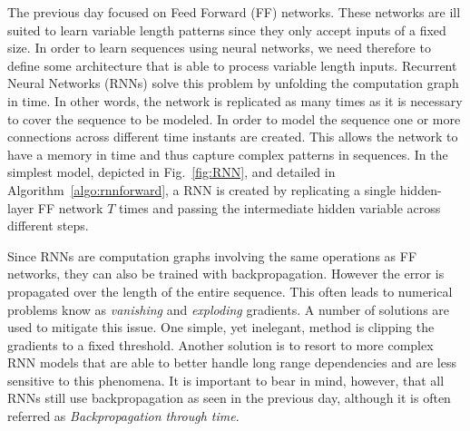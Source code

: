 The previous day focused on Feed Forward (FF) networks. These networks are ill
suited to learn variable length patterns since they only accept inputs of a
fixed size. In order to learn sequences using neural networks, we need therefore
to define some architecture that is able to process variable length inputs.
Recurrent Neural Networks (RNNs) solve this problem by unfolding the
computation graph in time. In other words, the network is replicated as many
times as it is necessary to cover the sequence to be modeled. In order
to model the sequence one or more connections across different time instants are
created. This allows the network to have a memory in time and thus capture
complex patterns in sequences. In the simplest model, depicted in
Fig.~\ref{fig:RNN}, and detailed in Algorithm~\ref{algo:rnnforward}, a RNN is
created by replicating a single hidden-layer FF network $T$ times and passing
the intermediate hidden variable across different steps. 

Since RNNs are computation graphs involving the same operations as FF networks,
they can also be trained with backpropagation. However the error is
 propagated over the length of the entire sequence. This often leads to 
numerical problems know as \textit{vanishing} and \textit{exploding} gradients.
A number of solutions are used to mitigate this issue. One simple, yet inelegant,
method is clipping the gradients to a fixed threshold. Another solution is to resort to more complex 
RNN models that are able to better handle long range dependencies and are less
sensitive to this phenomena. It is important to bear in mind, however, that
all RNNs still use backpropagation as seen in the previous day, although it is
often referred as \textit{Backpropagation through time}. 

